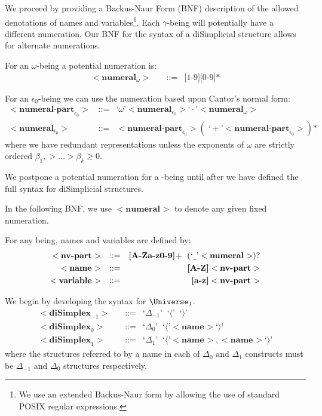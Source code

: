 \documentclass[a4paper,openany]{amsbook}
\begin{document}
We proceed by providing a Backus-Naur Form (BNF) description of the allowed
denotations of names and variables\footnote{We use an extended Backus-Naur form
by allowing the use of standard POSIX regular expressions.}. Each $\gamma$-being
will potentially have a different numeration. Our BNF for the syntax of a
diSimplicial structure allows for alternate numerations.

\newcommand{\bnf}[2]{\ensuremath{<\textbf{#1}_{#2}>}}
\newcommand{\bnfAssign}{\text{::=}}
\newcommand{\bnfT}[1]{\text{`}#1\text{'}}

For an $\omega$-being a potential numeration is:
%
\begin{align*}
%
\bnf{numeral}{\omega} \quad & \bnfAssign & \text{[1-9]}\text{[0-9]*}
%
\end{align*}
%

For an $\epsilon_0$-being we can use the numeration based upon Cantor's normal
form:
%
\begin{align*}
%
\bnf{numeral-part}{\epsilon_0} \quad & \bnfAssign & 
  \bnfT{\omega} \bnf{numeral}{\epsilon_0} \bnfT{\cdot} \bnf{numeral}{\omega} \\
%
\bnf{numeral}{\epsilon_0} \quad & \bnfAssign & 
  \bnf{numeral-part}{\epsilon_0} ( \; \bnfT{+} \bnf{numeral-part}{\epsilon_0} ) \text{*}
%
\end{align*}
%
where we have redundant representations unless the exponents of $\omega$ are
strictly ordered $\beta_1, > \ldots > \beta_k \ge 0$.

We postpone a potential numeration for a \Cardinal-being until after we have
defined the full syntax for diSimplicial structures.

In the following BNF, we use \bnf{numeral}{} to denote any given fixed
numeration.

For any being, names and variables are defined by:
%
\begin{align*}
%
\bnf{nv-part}{} \quad & \bnfAssign & 
  \textbf{[A-Za-z0-9]+} \;\; ( \bnfT{\underline{\hspace{1ex} }} \bnf{numeral}{} )\text{?} \\
%
\bnf{name}{} \quad & \bnfAssign & \textbf{[A-Z]} \bnf{nv-part}{} \\
%
\bnf{variable}{} \quad & \bnfAssign & \textbf{[a-z]} \bnf{nv-part}{}
%
\end{align*}

We begin by developing the syntax for $\Universe_1$.
%
\begin{align*}
%
\bnf{diSimplex}{-1} \quad & \bnfAssign & \bnfT{\Delta_{-1}} \;\; \bnfT{\langle} \;\; \bnfT{\rangle} \\
%
\bnf{diSimplex}{0} \quad & \bnfAssign & \bnfT{\Delta_0} \;\; \bnfT{\langle} \bnf{name}{} \bnfT{\rangle} \\
%
\bnf{diSimplex}{1} \quad & \bnfAssign & 
  \bnfT{\Delta_1} \;\; \bnfT{\langle} \bnf{name}{}, \bnf{name}{} \bnfT{\rangle}
%
\end{align*}
%
where the structures referred to by a name in each of $\Delta_0$ and $\Delta_1$
constructs must be $\Delta_{-1}$ and $\Delta_0$ structures respectively.
\end{document}
